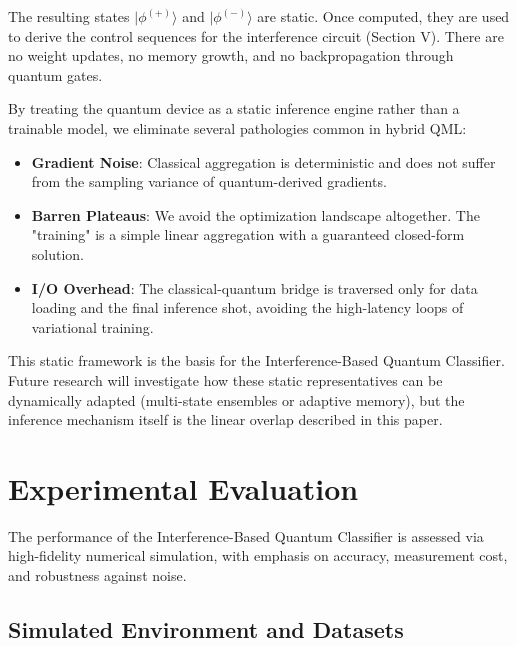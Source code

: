\documentclass[conference]{IEEEtran}
\begin{document}
The resulting states $|\phi^{(+)}\rangle$ and $|\phi^{(-)}\rangle$ are static. Once computed, they are used to derive the control sequences for the interference circuit (Section V). There are no weight updates, no memory growth, and no backpropagation through quantum gates. 

By treating the quantum device as a static inference engine rather than a trainable model, we eliminate several pathologies common in hybrid QML:
\begin{itemize}
    \item \textbf{Gradient Noise}: Classical aggregation is deterministic and does not suffer from the sampling variance of quantum-derived gradients.
    \item \textbf{Barren Plateaus}: We avoid the optimization landscape altogether. The "training" is a simple linear aggregation with a guaranteed closed-form solution.
    \item \textbf{I/O Overhead}: The classical-quantum bridge is traversed only for data loading and the final inference shot, avoiding the high-latency loops of variational training.
\end{itemize}

This static framework is the basis for the Interference-Based Quantum Classifier. Future research will investigate how these static representatives can be dynamically adapted (multi-state ensembles or adaptive memory), but the inference mechanism itself is the linear overlap described in this paper.

\section{Experimental Evaluation}

The performance of the Interference-Based Quantum Classifier is assessed via high-fidelity numerical simulation, with emphasis on accuracy, measurement cost, and robustness against noise.

\subsection{Simulated Environment and Datasets}
\end{document}
